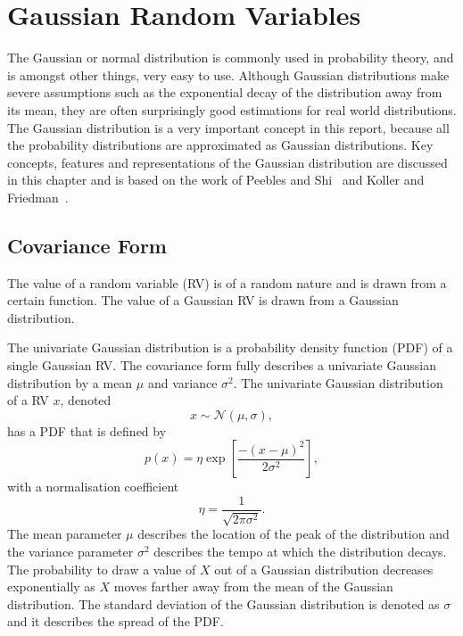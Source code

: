 \documentclass[12pt,oneside,openany,a4paper, %
afrikaans,english,
]{memoir}
\numberwithin{equation}{chapter}
\begin{document}
\chapter{Gaussian Random Variables}
The Gaussian or normal distribution is commonly used in probability theory, and is amongst other things, very easy to use. Although Gaussian distributions make severe assumptions such as the exponential decay of the distribution away from its mean, they are often surprisingly good estimations for real world distributions. The Gaussian distribution is a very important concept in this report, because all the probability distributions are approximated as Gaussian distributions. Key concepts, features and representations of the Gaussian distribution are discussed in this chapter and is based on the work of Peebles and Shi~\cite{peebles} and Koller and Friedman~\cite{koller}.

\section{Covariance Form}
The value of a random variable (RV) is of a random nature and is drawn from a certain function. The value of a Gaussian RV is drawn from a Gaussian distribution.

The univariate Gaussian distribution is a probability density function (PDF) of a single Gaussian RV. The covariance form fully describes a univariate Gaussian distribution by a mean $\mu$ and variance $\sigma^2$.
The univariate Gaussian distribution of a RV $x$, denoted
\begin{equation}
x\sim\mathcal{N}(\mu,\sigma),
\end{equation}
has a PDF that is defined by
\begin{equation}\label{eq:1}
p(x) = \eta\exp\left[\frac{-(x-\mu)^2}{2\sigma^2}\right],
\end{equation}
with a normalisation coefficient 
\begin{equation}\label{eq:2}
\eta = \frac{1}{\sqrt{2\pi\sigma^2}}.
\end{equation}
The mean parameter $\mu$ describes the location of the peak of the distribution and the variance parameter $\sigma^2$ describes the tempo at which the distribution decays. The probability to draw a value of $X$ out of a Gaussian distribution decreases exponentially as $X$ moves farther away from the mean of the Gaussian distribution. The standard deviation of the Gaussian distribution is denoted as $\sigma$ and it  describes the spread of the PDF.
\end{document}
